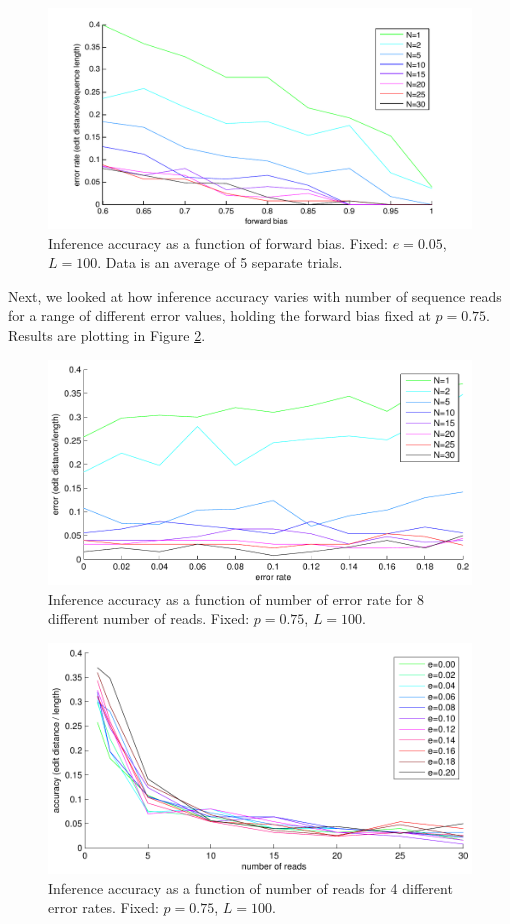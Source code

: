 \documentclass[12pt]{article}
\begin{document}
\begin{figure}
\centering
\includegraphics[width=1\textwidth]{fig/np_sweep_p.pdf}
\caption{Inference accuracy as a function of forward bias. Fixed: $e=0.05$, $L=100$. Data is an average of 5 separate trials.}
\label{fig:np_sweep_p}
\end{figure}

Next, we looked at how inference accuracy varies with number of sequence reads for a range of different error values, holding the forward bias fixed at $p=0.75$. Results are plotting in Figure \ref{fig:ne_sweep_e}.

\begin{figure}
\centering
\includegraphics[width=1\textwidth]{fig/ne_sweep_e.pdf}
\caption{Inference accuracy as a function of number of error rate for 8 different number of reads. Fixed: $p=0.75$, $L=100$.}
\label{fig:ne_sweep_e}
\end{figure}

\begin{figure}
\centering
\includegraphics[width=1\textwidth]{fig/ne_sweep_n.pdf}
\caption{Inference accuracy as a function of number of reads for 4 different error rates. Fixed: $p=0.75$, $L=100$.}
\label{fig:ne_sweep_n}
\end{figure}
\end{document}

